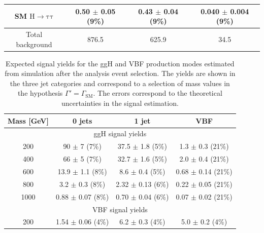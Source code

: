 \begin{table}[htb]
\begin{center}
{\begin{tabular}{c c c c }
 SM $\mathrm{H\to\tau\tau}$                &      0.50 $\pm$       0.05 (9\%)              &       0.43 $\pm$       0.04 (9\%)             &      0.040 $\pm$       0.004 (9\%)               \\
      
\midrule
    Total background          &    876.5               &     625.9           &     34.5          \\
\bottomrule
\end{tabular}
}
\end{center}
\end{table}

\begin{table}[htb]
\begin{center}
\caption{Expected signal yields for the ggH and VBF production modes estimated from simulation after the analysis event selection. The yields are shown in the three jet categories and correspond to a selection of mass values in the hypothesis $\Gamma' = \Gamma_\mathrm{SM}$. The errors correspond to the theoretical uncertainties in the signal estimation.}\label{tab:sig_yields}
\small{\begin{tabular}{c c c c } 
\toprule
                 Mass [GeV]                 &          0 jets    &          1 jet              & VBF           \\ 
\midrule
\multicolumn{4}{c}{ggH signal yields} \\
\midrule
 200                        &      90 $\pm$       7 (7\%)             &      37.5 $\pm$       1.8 (5\%)     &       1.3 $\pm$       0.3 (21\%)      \\
 400                        &      66 $\pm$       5 (7\%)             &      32.7 $\pm$       1.6 (5\%)     &       2.0 $\pm$       0.4 (21\%)      \\
 600                        &      13.9 $\pm$       1.1 (8\%)             &       8.6 $\pm$       0.4 (5\%)     &       0.68 $\pm$       0.14 (21\%)      \\
 800                        &       3.2 $\pm$       0.3 (8\%)             &       2.32 $\pm$       0.13 (6\%)     &       0.22 $\pm$       0.05 (21\%)      \\
 1000                       &       0.88 $\pm$       0.07 (8\%)             &       0.70 $\pm$       0.04 (6\%)     &       0.07 $\pm$       0.02 (21\%)      \\
\midrule
\multicolumn{4}{c}{VBF signal yields} \\
\midrule
 200                        &       1.54 $\pm$       0.06 (4\%)             &       6.2 $\pm$       0.3 (4\%)     &       5.0 $\pm$       0.2 (4\%)      \\

\end{tabular}}
\end{center}
\end{table}
